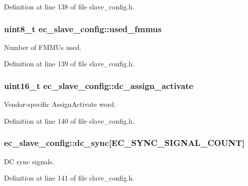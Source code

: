 Definition at line 138 of file slave\-\_\-config.\-h.

\subsubsection[{used\-\_\-fmmus}]{\setlength{\rightskip}{0pt plus 5cm}uint8\-\_\-t ec\-\_\-slave\-\_\-config\-::used\-\_\-fmmus}\label{structec__slave__config_ab34b5531b56f3bb35ea0647f3aa8345a}


Number of F\-M\-M\-Us used. 



Definition at line 139 of file slave\-\_\-config.\-h.

\subsubsection[{dc\-\_\-assign\-\_\-activate}]{\setlength{\rightskip}{0pt plus 5cm}uint16\-\_\-t ec\-\_\-slave\-\_\-config\-::dc\-\_\-assign\-\_\-activate}\label{structec__slave__config_a444000aa859f4830053b65518fc65233}


Vendor-\/specific Assign\-Activate word. 



Definition at line 140 of file slave\-\_\-config.\-h.

\subsubsection[{dc\-\_\-sync}]{ ec\-\_\-slave\-\_\-config\-::dc\-\_\-sync[{\bf E\-C\-\_\-\-S\-Y\-N\-C\-\_\-\-S\-I\-G\-N\-A\-L\-\_\-\-C\-O\-U\-N\-T}]}\label{structec__slave__config_a947ad2e8f2573df6655965524575c5b8}


D\-C sync signals. 



Definition at line 141 of file slave\-\_\-config.\-h.


